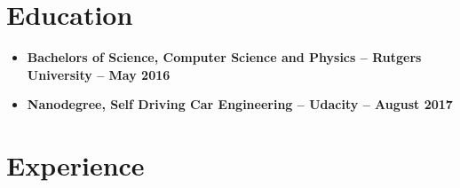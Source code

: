 \documentclass[12pt,a4paper,sans]{moderncv}
\begin{document}
\makecvtitle

\section{Education}
\begin{itemize}
\item{\textbf{Bachelors of Science, Computer Science and Physics -- Rutgers University -- May 2016}} 
\item{\textbf{Nanodegree, Self Driving Car Engineering  -- Udacity -- August 2017}}
\end{itemize}

\section{Experience}
\end{document}
